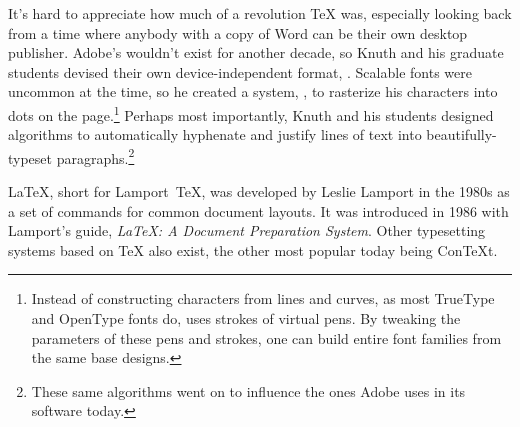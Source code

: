 It's hard to appreciate how much of a revolution \TeX{} was,
especially looking back from a time where anybody with a copy
of Word can be their own desktop publisher.
Adobe's  wouldn't exist for another decade, so Knuth
and his graduate students devised their own device-independent format,
.
Scalable fonts were uncommon at the time, so he created a system,
\MF, to rasterize his characters into dots on the
page.\punckern\footnote{%
Instead of constructing characters from lines and curves,
as most TrueType and OpenType fonts do,
\MF{} uses strokes of virtual pens.
By tweaking the parameters of these pens and strokes, one can build entire
font families from the same base designs.}
Perhaps most importantly, Knuth and his students designed algorithms
to automatically hyphenate and justify lines of text into
beautifully-typeset paragraphs.\punckern\footnote{These same algorithms went
on to influence the ones Adobe uses in its software today.\punckern{}}

\LaTeX{}, short for Lamport~\TeX{}, was developed by Leslie Lamport in the 1980s
as a set of commands for common document layouts.
It was introduced in 1986 with Lamport's guide,
\textit{\LaTeX: A Document Preparation System}.
Other typesetting systems based on \TeX{} also exist,
the other most popular today being Con\TeX{}t.

